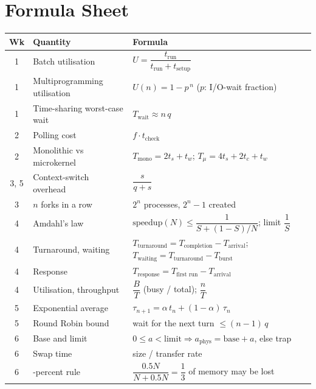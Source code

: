 \documentclass[11pt,a4paper]{article}
\begin{document}
\newpage
\section{Formula Sheet}
\label{sec:sheet}
\begin{center}
\small
\renewcommand{\arraystretch}{1.55}
\begin{tabularx}{\linewidth}{@{}c >{\raggedright\arraybackslash}p{4.3cm} >{\raggedright\arraybackslash}X@{}}
\toprule
\textbf{Wk} & \textbf{Quantity} & \textbf{Formula} \\
\midrule
1 & Batch utilisation & $U = \dfrac{t_{\text{run}}}{t_{\text{run}} + t_{\text{setup}}}$ \\
1 & Multiprogramming utilisation & $U(n) = 1 - p^{\,n}$ \quad ($p$: I/O-wait fraction) \\
1 & Time-sharing worst-case wait & $T_{\text{wait}} \approx n\,q$ \\
2 & Polling cost & $f \cdot t_{\text{check}}$ \\
2 & Monolithic vs microkernel & $T_{\text{mono}} = 2t_s + t_w$; \quad $T_{\mu} = 4t_s + 2t_c + t_w$ \\
3, 5 & Context-switch overhead & $\dfrac{s}{q+s}$ \\
3 & $n$ forks in a row & $2^{n}$ processes, $2^{n}-1$ created \\
4 & Amdahl's law & $\text{speedup}(N) \le \dfrac{1}{S + (1-S)/N}$; \quad limit $\dfrac{1}{S}$ \\
4 & Turnaround, waiting & $T_{\text{turnaround}} = T_{\text{completion}} - T_{\text{arrival}}$; \quad $T_{\text{waiting}} = T_{\text{turnaround}} - T_{\text{burst}}$ \\
4 & Response & $T_{\text{response}} = T_{\text{first run}} - T_{\text{arrival}}$ \\
4 & Utilisation, throughput & $\dfrac{B}{T}$ (busy / total); \quad $\dfrac{n}{T}$ \\
5 & Exponential average & $\tau_{n+1} = \alpha\, t_n + (1-\alpha)\, \tau_n$ \\
5 & Round Robin bound & wait for the next turn $\le (n-1)\,q$ \\
6 & Base and limit & $0 \le a < \text{limit} \Rightarrow a_{\text{phys}} = \text{base} + a$, else trap \\
6 & Swap time & size / transfer rate \\
6 & 50-percent rule & $\dfrac{0.5N}{N + 0.5N} = \dfrac13$ of memory may be lost \\

\end{tabularx}
\end{center}
\end{document}
